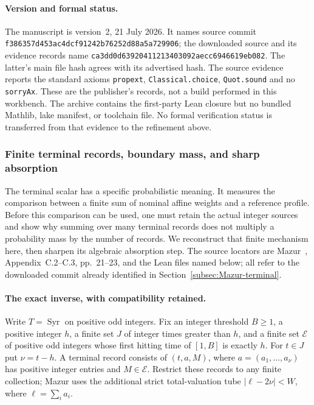 \paragraph{Version and formal status.}
The manuscript is version~2, 21 July 2026. It names source
commit \texttt{f386357d453ac4dcf91242b76252d88a5a729906};
the downloaded source and its evidence records name
\texttt{ca3dd0d63920411213403092aecc6946619eb082}.
The latter's main file hash agrees with its advertised hash.
The source evidence reports the standard axioms
\texttt{propext}, \texttt{Classical.choice}, \texttt{Quot.sound}
and no \texttt{sorryAx}. These are the publisher's records,
not a build performed in this workbench. The archive contains
the first-party Lean closure but no bundled Mathlib, lake
manifest, or toolchain file. No formal verification status
is transferred from that evidence to the refinement above.

\subsubsection{Finite terminal records, boundary mass, and sharp absorption}
\label{sec:Mazur-finite}

The terminal scalar has a specific probabilistic meaning. It measures the
comparison between a finite sum of nominal affine weights and a reference
profile. Before this comparison can be used, one must retain the actual
integer sources and show why summing over many terminal records does not
multiply a probability mass by the number of records. We reconstruct that
finite mechanism here, then sharpen its algebraic absorption step.
The source locators are Mazur~\cite{Mazur2026v2}, Appendix~C.2--C.3,
pp.~21--23, and the Lean files named below; all refer to the downloaded
commit already identified in Section~\ref{subsec:Mazur-terminal}.

\paragraph{The exact inverse, with compatibility retained.}
Write $T=\operatorname{Syr}$ on positive odd integers. Fix an integer
threshold $B\ge1$, a positive integer $h$, a finite set $J$ of integer
times greater than $h$, and a finite set $\mathcal E$ of positive odd
integers whose first hitting time of $[1,B]$ is exactly $h$.
For $t\in J$ put $\nu=t-h$. A terminal record consists of
$(t,a,M)$, where $a=(a_1,\ldots,a_\nu)$ has positive integer entries
and $M\in\mathcal E$. Restrict these records to any finite collection;
Mazur uses the additional strict total-valuation tube
$|\ell-2\nu|<W$, where $\ell=\sum_i a_i$.

